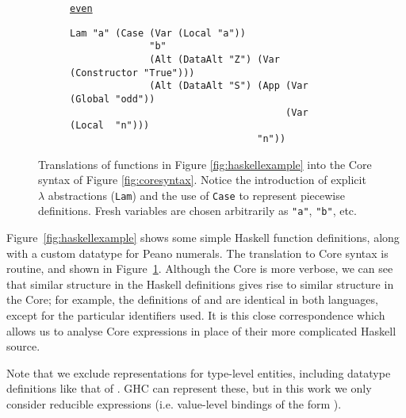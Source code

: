 \begin{figure}
\begin{subfigure}[even]{\textwidth}
    \begin{small}
      \underline{\texttt{even}}
      \begin{verbatim}
Lam "a" (Case (Var (Local "a"))
              "b"
              (Alt (DataAlt "Z") (Var (Constructor "True")))
              (Alt (DataAlt "S") (App (Var (Global "odd"))
                                      (Var (Local  "n")))
                                 "n"))
      \end{verbatim}
    \end{small}
  \end{subfigure}
  \caption{Translations of functions in Figure \ref{fig:haskellexample} into the
    Core syntax of Figure \ref{fig:coresyntax}. Notice the introduction of
    explicit $\lambda$ abstractions (\texttt{Lam}) and the use of \texttt{Case}
    to represent piecewise definitions. Fresh variables are chosen arbitrarily
    as \texttt{"a"}, \texttt{"b"}, etc.}
  \label{fig:coreexample}
\end{figure}

Figure~\ref{fig:haskellexample} shows some simple Haskell function definitions,
along with a custom datatype for Peano numerals. The translation to Core syntax
is routine, and shown in Figure~\ref{fig:coreexample}. Although the Core is more
verbose, we can see that similar structure in the Haskell definitions gives rise
to similar structure in the Core; for example, the definitions of  and
 are identical in both languages, except for the particular identifiers
used. It is this close correspondence which allows us to analyse Core
expressions in place of their more complicated Haskell source.

Note that we exclude representations for type-level entities, including datatype
definitions like that of . GHC can represent these, but in this work we
only consider reducible expressions (i.e. value-level bindings of the form
\mbox{}).
